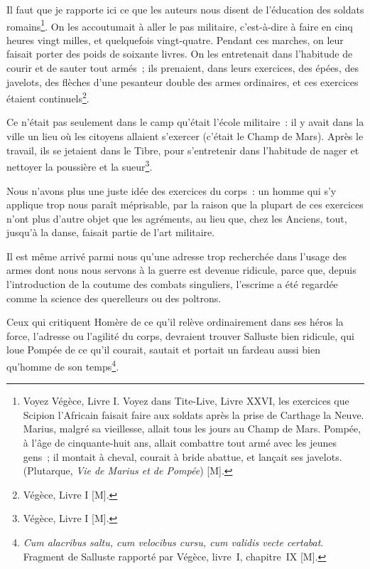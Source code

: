 \documentclass[french,twoside]{book} %
\begin{document}
Il faut que je rapporte ici ce que les auteurs nous disent de l’éducation des soldats romains\footnote{Voyez Végèce, Livre I. Voyez dans Tite-Live, Livre XXVI, les exercices que Scipion l’Africain faisait faire aux soldats après la prise de Carthage la Neuve. Marius, malgré sa vieillesse, allait tous les jours au Champ de Mars. Pompée, à l’âge de cinquante-huit ans, allait combattre tout armé avec les jeunes gens ; il montait à cheval, courait à bride abattue, et lançait ses javelots. (Plutarque, {\itshape Vie de Marius et de Pompée}) [M].}. On les accoutumait à aller le pas militaire, c’est-à-dire à faire en cinq heures vingt milles, et quelquefois vingt-quatre. Pendant ces marches, on leur faisait porter des poids de soixante livres. On les entretenait dans l’habitude de courir et de sauter tout armés ; ils prenaient, dans leurs exercices, des épées, des javelots, des flèches d’une pesanteur double des armes ordinaires, et ces exercices étaient continuels\footnote{Végèce, Livre I [M].}.\par
Ce n’était pas seulement dans le camp qu’était l’école militaire : il y avait dans la ville un lieu où les citoyens allaient s’exercer (c’était le Champ de Mars). Après le travail, ils se jetaient dans le Tibre, pour s’entretenir dans l’habitude de nager et nettoyer la poussière et la sueur\footnote{Végèce, Livre I [M].}.\par
Nous n’avons plus une juste idée des exercices du corps : un homme qui s’y applique trop nous paraît méprisable, par la raison que la plupart de ces exercices n’ont plus d’autre objet que les agréments, au lieu que, chez les Anciens, tout, jusqu’à la danse, faisait partie de l’art militaire.\par
Il est même arrivé parmi nous qu’une adresse trop recherchée dans l’usage des armes dont nous nous servons à la guerre est devenue ridicule, parce que, depuis l’introduction de la coutume des combats singuliers, l’escrime a été regardée comme la science des querelleurs ou des poltrons.\par
Ceux qui critiquent Homère de ce qu’il relève ordinairement dans ses héros la force, l’adresse ou l’agilité du corps, devraient trouver Salluste bien ridicule, qui loue Pompée de ce qu’il courait, sautait et portait un fardeau aussi bien qu’homme de son temps\footnote{{\itshape Cum alacribus saltu, cum velocibus cursu, cum validis vecte certabat}. Fragment de Salluste rapporté par Végèce, livre I, chapitre IX [M].}.\par
\end{document}
